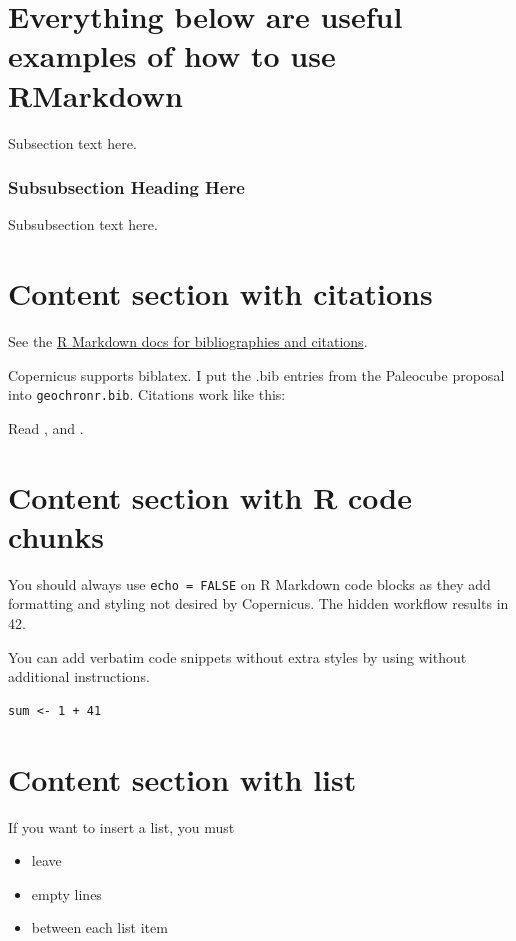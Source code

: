 \documentclass[gc, manuscript]{copernicus}
\begin{document}
\section{Everything below are useful examples of how to use RMarkdown}

Subsection text here.

\subsubsection{Subsubsection Heading Here}

Subsubsection text here.

\section{Content section with citations}

See the \href{http://rmarkdown.rstudio.com/authoring_bibliographies_and_citations.html}{R Markdown docs for bibliographies and citations}.

Copernicus supports biblatex. I put the .bib entries from the Paleocube proposal into \texttt{geochronr.bib}. Citations work like this:

Read \citep{Evans_QSR13}, and \citep[see][]{PRYSM}.

\section{Content section with R code chunks}

You should always use \texttt{echo\ =\ FALSE} on R Markdown code blocks as they add formatting and styling not desired by Copernicus.
The hidden workflow results in 42.

You can add verbatim code snippets without extra styles by using \texttt{\textasciigrave{}\textasciigrave{}\textasciigrave{}} without additional instructions.

\begin{verbatim}
sum <- 1 + 41
\end{verbatim}

\section{Content section with list}

If you want to insert a list, you must

\begin{itemize}
\item
  leave
\item
  empty lines
\item
  between each list item
\end{itemize}
\end{document}
